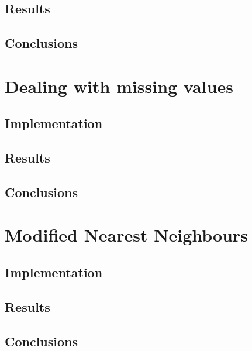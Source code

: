 \documentclass[12pt,a4paper]{article}
\begin{document}
\begin{singlespace}
\subsection{Results}
\subsection{Conclusions}

\section{Dealing with missing values}
\subsection{Implementation}


\subsection{Results}
\subsection{Conclusions}

\section{Modified Nearest Neighbours}
\subsection{Implementation}
\subsection{Results}
\subsection{Conclusions}


\end{singlespace}
\end{document}
